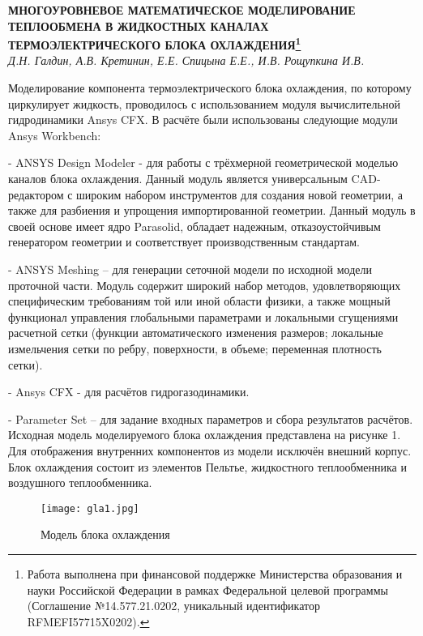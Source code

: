 \begin{center}{ \bf  МНОГОУРОВНЕВОЕ МАТЕМАТИЧЕСКОЕ МОДЕЛИРОВАНИЕ ТЕПЛООБМЕНА В ЖИДКОСТНЫХ КАНАЛАХ ТЕРМОЭЛЕКТРИЧЕСКОГО БЛОКА ОХЛАЖДЕНИЯ\footnote{Работа выполнена при финансовой поддержке Министерства образования и науки Российской Федерации в рамках Федеральной целевой программы (Соглашение №14.577.21.0202, уникальный идентификатор RFMEFI57715X0202).}}\\
{\it Д.Н. Галдин, А.В. Кретинин, Е.Е. Спицына Е.Е., И.В. Рощупкина И.В.} \\
\end{center}

Моделирование компонента термоэлектрического блока охлаждения, по которому циркулирует жидкость, проводилось с использованием модуля вычислительной гидродинамики Ansys CFX.
В расчёте были использованы следующие модули Ansys Workbench:

-	ANSYS Design Modeler - для работы с трёхмерной геометрической моделью каналов блока охлаждения. Данный модуль является универсальным CAD-редактором с широким набором инструментов для создания новой геометрии, а также для разбиения и упрощения импортированной геометрии. Данный модуль в своей основе имеет ядро Parasolid, обладает надежным, отказоустойчивым генератором геометрии и соответствует производственным стандартам.

-	ANSYS Meshing – для генерации сеточной модели по исходной модели проточной части. Модуль содержит широкий набор методов, удовлетворяющих специфическим требованиям той или иной области физики, а также мощный функционал управления глобальными параметрами и локальными сгущениями расчетной сетки (функции автоматического изменения размеров; локальные измельчения сетки по ребру, поверхности, в объеме; переменная плотность сетки).

-	Ansys CFX - для расчётов гидрогазодинамики.

-	Parameter Set – для задание входных параметров и сбора результатов расчётов.
Исходная модель моделируемого блока охлаждения представлена на рисунке 1. Для отображения внутренних компонентов из модели исключён внешний корпус. Блок охлаждения состоит из элементов Пельтье, жидкостного теплообменника и воздушного теплообменника.

\begin{figure}
	\centering
	\texttt{[image: gla1.jpg]}
	\caption{Модель блока охлаждения}
\end{figure}

